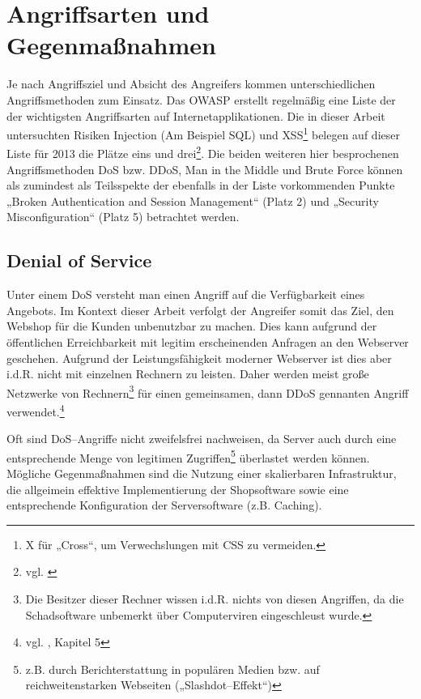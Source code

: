 \section{Angriffsarten und Gegenmaßnahmen}
\label{sec:hauptteil}

Je nach Angriffsziel und Absicht des Angreifers kommen unterschiedlichen Angriffsmethoden zum Einsatz. Das \ac{OWASP} erstellt regelmäßig eine Liste der der wichtigsten Angriffsarten auf Internetapplikationen. Die in dieser Arbeit untersuchten Risiken Injection (Am Beispiel \ac{SQL}) und \acs{XSS}\footnote{X für „Cross“, um Verwechslungen mit \ac{CSS} zu vermeiden.} belegen auf dieser Liste für 2013 die Plätze eins und drei\footnote{vgl. \cite{owasp}}. Die beiden weiteren hier besprochenen Angriffsmethoden \ac{DoS} bzw. \ac{DDoS}, Man in the Middle und Brute Force können als zumindest als Teilsspekte der ebenfalls in der Liste vorkommenden Punkte „Broken Authentication and Session Management“ (Platz 2) und „Security Misconfiguration“ (Platz 5) betrachtet werden.

\subsection{Denial of Service}
\label{sec:dos}

Unter einem \ac{DoS} versteht man einen Angriff auf die Verfügbarkeit eines Angebots. Im Kontext dieser Arbeit verfolgt der Angreifer somit das Ziel, den Webshop für die Kunden unbenutzbar zu machen. Dies kann aufgrund der öffentlichen Erreichbarkeit mit legitim erscheinenden Anfragen an den Webserver geschehen. Aufgrund der Leistungsfähigkeit moderner Webserver ist dies aber i.d.R. nicht mit einzelnen Rechnern zu leisten. Daher werden meist große Netzwerke von Rechnern\footnote{Die Besitzer dieser Rechner wissen i.d.R. nichts von diesen Angriffen, da die Schadsoftware unbemerkt über Computerviren eingeschleust wurde.} für einen gemeinsamen, dann \ac{DDoS} gennanten Angriff verwendet.\footnote{vgl. \cite{carr}, Kapitel 5}

Oft sind \ac{DoS}--Angriffe nicht zweifelsfrei nachweisen, da Server auch durch eine entsprechende Menge von legitimen Zugriffen\footnote{z.B. durch Berichterstattung in populären Medien bzw. auf reichweitenstarken Webseiten („Slashdot--Effekt“)} überlastet werden können. Mögliche Gegenmaßnahmen sind die Nutzung einer skalierbaren Infrastruktur, die allgeimein effektive Implementierung der Shopsoftware sowie eine entsprechende Konfiguration der Serversoftware (z.B. Caching). 

